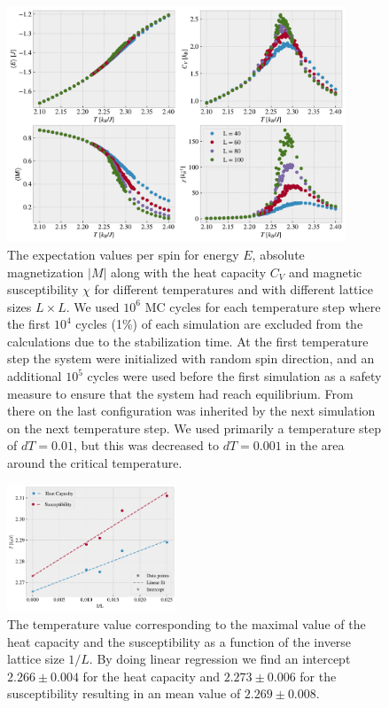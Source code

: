 \documentclass[%
 reprint,
nofootinbib,
aps,
]{revtex4-1}
\begin{document}
\onecolumngrid

 \begin{figure}[H]
  \centering
  \includegraphics[width=0.9\textwidth]{figures/phase_subplot.pdf}
  \caption{The expectation values per spin for energy $E$, absolute magnetization $|M|$ along with the heat capacity $C_V$ and magnetic susceptibility $\chi$ for different temperatures and with different lattice sizes $L\times L$. We used $10^6$ MC cycles for each temperature step where the first $10^4$ cycles (1\%) of each simulation are excluded from the calculations due to the stabilization time. At the first temperature step the system were initialized with random spin direction, and an additional $10^5$ cycles were used before the first simulation as a safety measure to ensure that the system had reach equilibrium. From there on the last configuration was inherited by the next simulation on the next temperature step. We used primarily a temperature step of $dT = 0.01$, but this was decreased to $dT = 0.001$ in the area around the critical temperature. }
  \label{fig:final_phase}
\end{figure}


\twocolumngrid

 \begin{figure}[H] 
  \centering
  \includegraphics[width=0.45\textwidth]{figures/findTc.pdf}
  \caption{The temperature value corresponding to the maximal value of the heat capacity and the susceptibility as a function of the inverse lattice size $1/L$. By doing linear regression we find an intercept $2.266 \pm 0.004$ for the heat capacity and $2.273 \pm 0.006$ for the susceptibility resulting in an mean value of $2.269 \pm 0.008$.} 
  \label{fig:findTc}
\end{figure}
\end{document}
